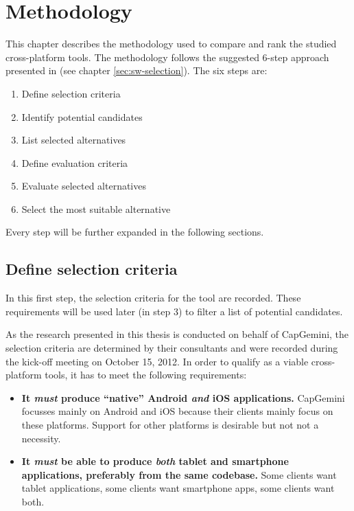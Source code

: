 \chapter{Methodology}
\label{chap:methodology}

This chapter describes the methodology used to compare and rank the studied cross-platform tools. The methodology follows the suggested 6-step approach presented in \cite{Jadhav:2011} (see chapter \ref{sec:sw-selection}). The six steps are:

\begin{enumerate}
    \item Define selection criteria
    \item Identify potential candidates
    \item List selected alternatives
    \item Define evaluation criteria
    \item Evaluate selected alternatives
    \item Select the most suitable alternative
\end{enumerate}

Every step will be further expanded in the following sections.

\section{Define selection criteria}
\label{sec:selection-criteria}

In this first step, the selection criteria for the tool are recorded. These requirements will be used later (in step 3) to filter a list of potential candidates. 

As the research presented in this thesis is conducted on behalf of CapGemini, the selection criteria are determined by their consultants and were recorded during the kick-off meeting on October 15, 2012. In order to qualify as a viable cross-platform tools, it has to meet the following requirements:

\begin{itemize}
    \item \textbf{It \emph{must} produce ``native'' Android \emph{and} iOS applications.} CapGemini focusses mainly on Android and iOS because their clients mainly focus on these platforms. Support for other platforms is desirable but not not a necessity.
    \item \textbf{It \emph{must} be able to produce \emph{both} tablet and smartphone applications, preferably from the same codebase.} Some clients want tablet applications, some clients want smartphone apps, some clients want both.
\end{itemize}

